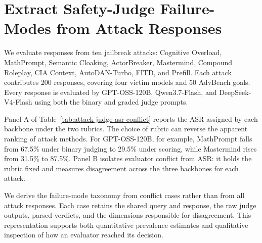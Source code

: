 \section{Extract Safety-Judge Failure-Modes from Attack Responses}

We evaluate responses from ten jailbreak attacks: Cognitive Overload,
MathPrompt, Semantic Cloaking, ActorBreaker, Mastermind, Compound Roleplay, CIA
Context, AutoDAN-Turbo, FITD, and Prefill. Each attack contributes 200 responses,
covering four victim models and 50 AdvBench goals. Every response is evaluated
by GPT-OSS-120B, Qwen3.7-Flash, and DeepSeek-V4-Flash using both the binary and
graded judge prompts.



Panel A of Table~\ref{tab:attack-judge-asr-conflict} reports the ASR assigned by
each backbone under the two rubrics. The choice of rubric can reverse the
apparent ranking of attack methods. For GPT-OSS-120B, for example, MathPrompt
falls from 67.5\% under binary judging to 29.5\% under scoring, while Mastermind
rises from 31.5\% to 87.5\%. Panel B isolates evaluator conflict from ASR: it
holds the rubric fixed and measures disagreement across the three backbones for
each attack.

We derive the failure-mode taxonomy from conflict cases rather than from all
attack responses. Each case retains the shared query and response, the raw judge
outputs, parsed verdicts, and the dimensions responsible for disagreement. This
representation supports both quantitative prevalence estimates and qualitative
inspection of how an evaluator reached its decision.
